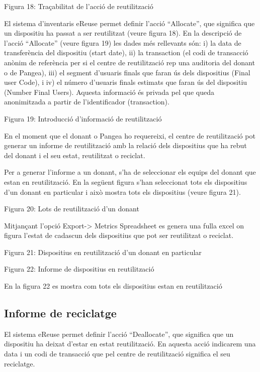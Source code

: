 \documentclass[
]{book}
\begin{document}
Figura 18: Traçabilitat de l'acció de reutilització

El sistema d'inventaris eReuse permet definir l'acció ``Allocate'', que significa que un dispositiu ha passat a ser reutilitzat (veure figura 18). En la descripció de l'acció ``Allocate'' (veure figura 19) les dades més rellevants són: i) la data de transferència del dispositiu (start date), ii) la transaction (el codi de transacció anònim de referència per si el centre de reutilització rep una
auditoria del donant o de Pangea), iii) el segment d'usuaris finals que faran ús dels dispositius (Final user Code), i iv) el número d'usuaris finals estimats que faran ús del dispositiu (Number Final Users). Aquesta informació és privada pel que queda anonimitzada a partir de l'identificador (transaction).

Figura 19: Introducció d'informació de reutilització

En el moment que el donant o Pangea ho requereixi, el centre de reutilització pot generar un
informe de reutilització amb la relació dels dispositius que ha rebut del donant i el seu estat,
reutilitzat o reciclat.

Per a generar l'informe a un donant, s'ha de seleccionar els equips del donant que estan en
reutilització. En la següent figura s'han seleccionat tots els dispositius d'un donant en particular
i això mostra tots els dispositius (veure figura 21).

Figura 20: Lots de reutilització d'un donant

Mitjançant l'opció Export-\textgreater{} Metrics Spreadsheet es genera una fulla excel on figura l'estat de
cadascun dels dispositius que pot ser reutilitzat o reciclat.

Figura 21: Dispositius en reutilització d'un donant en particular

Figura 22: Informe de dispositius en reutilització

En la figura 22 es mostra com tots els dispositius estan en reutilització

\hypertarget{informe-de-reciclatge}{%
\subsection{Informe de reciclatge}\label{informe-de-reciclatge}}

El sistema eReuse permet definir l'acció ``Deallocate'', que significa que un dispositiu ha deixat
d'estar en estat reutilització. En aquesta acció indicarem una data i un codi de transacció que
pel centre de reutilització significa el seu reciclatge.
\end{document}
